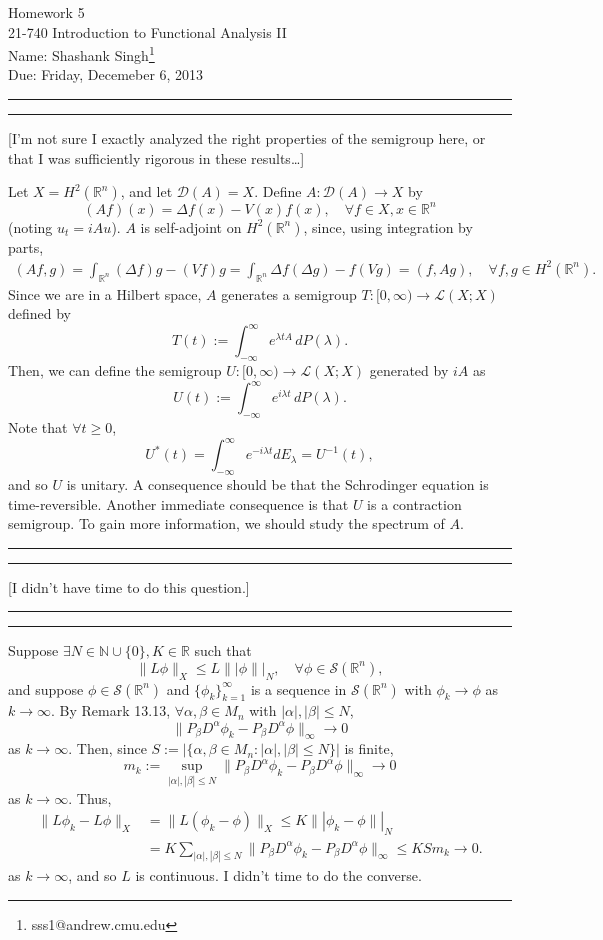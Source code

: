 \documentclass[11pt]{article}
\makeatletter
\newcounter{questionCounter}
\newcounter{partCounter}[questionCounter]
\newenvironment{question}[2][\arabic{questionCounter}]{%
    \setcounter{partCounter}{0}%
    \vspace{.25in} \hrule \vspace{0.5em}%
        \noindent{\bf #2}%
    \vspace{0.8em} \hrule \vspace{.10in}%
    \addtocounter{questionCounter}{1}%
}{}
\newcommand{\myname}{Shashank Singh\footnote{sss1@andrew.cmu.edu}}
\newcommand{\myclass}{21-740 Introduction to Functional Analysis II}
\newcommand{\myhwnum}{5}
\newcommand{\duedate}{Friday, Decemeber 6, 2013}
\newcommand{\inv}{^{-1}}
\newcommand{\N}{\mathbb{N}}             %
\newcommand{\R}{\mathbb{R}}             %
\newcommand{\D}{\mathcal{D}}            %
\renewcommand{\L}{\mathcal{L}}          %
\renewcommand{\S}{\mathcal{S}}          %
\makeatother
\begin{document}
\thispagestyle{plain}

{\Large Homework \myhwnum} \\
\myclass \\
Name: \myname \\
Due: \duedate

\begin{question}{Problem 1}
[I'm not sure I exactly analyzed the right properties of the semigroup here, or
that I was sufficiently rigorous in these results\dots]

Let $X = H^2(\R^n)$, and let $\D(A) = X$. Define $A : \D(A) \to X$ by
\[(Af)(x) = \Delta f(x) - V(x)f(x), \quad \forall f \in X, x \in \R^n\]
(noting $u_t = i A u$). $A$ is self-adjoint on $H^2(\R^n)$, since, using
integration by parts,
\begin{align*}
(Af,g)
	= \int_{\R^n} (\Delta f) g - (V f) g
	= \int_{\R^n} \Delta f (\Delta g) - f (V g)
	= (f,Ag), \quad \forall f,g \in H^2(\R^n).
\end{align*}
Since we are in a Hilbert space, $A$ generates a semigroup
$T : [0,\infty) \to \L(X;X)$ defined by
\[T(t) := \int_{-\infty}^\infty e^{\lambda tA} \, dP(\lambda).\]
Then, we can define the semigroup $U : [0,\infty) \to \L(X;X)$ generated by
$iA$ as
\[U(t) := \int_{-\infty}^\infty e^{i \lambda t} \, dP(\lambda).\]
Note that $\forall t \geq 0$,
\[U^*(t)
	= \int_{-\infty}^\infty e^{-i\lambda t} dE_\lambda
	= U\inv(t),
\]
and so $U$ is unitary. A consequence should be that the Schrodinger equation
is time-reversible. Another immediate consequence is that $U$ is a contraction
semigroup. To gain more information, we should study the spectrum of $A$.
\end{question}

\begin{question}{Problem 2}
[I didn't have time to do this question.]
\end{question}

\newpage
\begin{question}{Problem 3}
Suppose $\exists N \in \N \cup \{0\}, K \in \R$ such that
\[\|L\phi\|_X \leq L\||\phi\||_N, \quad \forall \phi \in \S(\R^n),\]
and suppose $\phi \in \S(\R^n)$ and $\{\phi_k\}_{k = 1}^\infty$ is a sequence
in $\S(\R^n)$ with $\phi_k \to \phi$ as $k \to \infty$.
By Remark 13.13, $\forall \alpha, \beta \in M_n$ with
$|\alpha|,|\beta| \leq N$,
\[\|P_\beta D^\alpha \phi_k - P_\beta D^\alpha \phi\|_\infty \to 0\]
as $k \to \infty$. Then, since
$S := |\{\alpha, \beta \in M_n : |\alpha|,|\beta| \leq N\}|$ is finite,
\[m_k := \sup_{|\alpha|,|\beta| \leq N}
	\|P_\beta D^\alpha \phi_k - P_\beta D^\alpha \phi\|_\infty
		\to 0
\]
as $k \to \infty$. Thus,
\begin{align*}
\|L\phi_k - L\phi\|_X
 &	= \|L(\phi_k - \phi)\|_X
 	\leq K \|| \phi_k - \phi \||_N	\\
 &	= K \sum_{|\alpha|,|\beta| \leq N} \|P_\beta D^\alpha \phi_k - P_\beta D^\alpha \phi\|_\infty
	\leq K S m_k
\to 0.
\end{align*}
as $k \to \infty$, and so $L$ is continuous.
I didn't time to do the converse.

\end{question}
\end{document}
